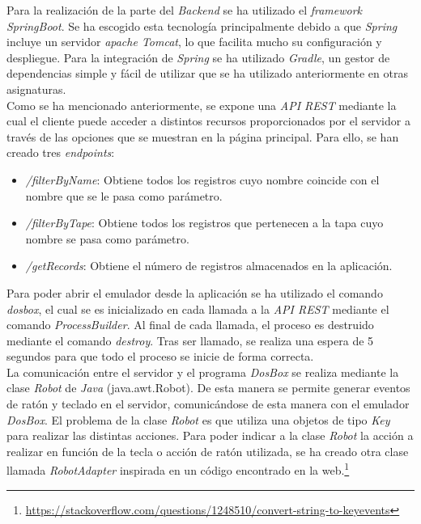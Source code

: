 \documentclass[10pt,a4paper]{article}
\begin{document}
Para la realización de la parte del \textit{Backend} se ha utilizado el \textit{framework SpringBoot}. Se ha escogido esta tecnología principalmente debido a que \textit{Spring} incluye un servidor \textit{apache Tomcat}, lo que facilita mucho su configuración y despliegue. Para la integración de \textit{Spring} se ha utilizado \textit{Gradle}, un gestor de dependencias simple y fácil de utilizar que se ha utilizado anteriormente en otras asignaturas.\\

Como se ha mencionado anteriormente, se expone una \textit{API REST} mediante la cual el cliente puede acceder a distintos recursos proporcionados por el servidor a través de las opciones que se muestran en la página principal. Para ello, se han creado tres \textit{endpoints}:
\begin{itemize}
	\item \textit{/filterByName}: Obtiene todos los registros cuyo nombre coincide con el nombre que se le pasa como parámetro.
	\item \textit{/filterByTape}: Obtiene todos los registros que pertenecen a la tapa cuyo nombre se pasa como parámetro.
	\item \textit{/getRecords}: Obtiene el número de registros almacenados en la aplicación.
\end{itemize}
Para poder abrir el emulador desde la aplicación se ha utilizado el comando \textit{dosbox}, el cual se es inicializado en cada llamada a la \textit{API REST} mediante el comando \textit{ProcessBuilder}.  Al final de cada llamada, el proceso es destruido mediante el comando \textit{destroy}. Tras ser llamado, se realiza una espera de 5 segundos para que todo el proceso se inicie de forma correcta.\\

La comunicación entre el servidor y el programa \textit{DosBox} se realiza mediante la clase \textit{Robot} de \textit{Java} (java.awt.Robot). De esta manera se permite generar eventos de ratón y teclado en el servidor, comunicándose de esta manera con el emulador \textit{DosBox}. El problema de la clase \textit{Robot} es que utiliza una objetos de tipo \textit{Key} para realizar las distintas acciones. Para poder indicar a la clase \textit{Robot} la acción a realizar en función de la tecla o acción de ratón utilizada, se ha creado otra clase llamada \textit{RobotAdapter} inspirada en un código encontrado en la web.\footnote{\url{https://stackoverflow.com/questions/1248510/convert-string-to-keyevents}}\\
\end{document}
